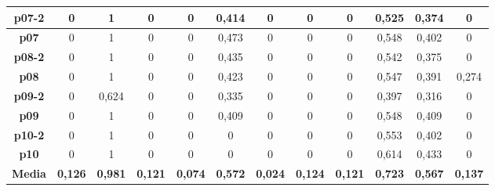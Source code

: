 \documentclass{article}
\begin{document}
\begin{landscape}
\begin{table}[]
\begin{tabular}{|c|c|c|c|c|c|c|c|c|c|c|c|}
    \textbf{p07-2}  &  0      &  1      &  0      &  0      &  0,414  &  0      &  0      &  0      &  0,525  &  0,374  &  0     \\ \hline
    \textbf{p07}    &  0      &  1      &  0      &  0      &  0,473  &  0      &  0      &  0      &  0,548  &  0,402  &  0     \\ \hline
    \textbf{p08-2}  &  0      &  1      &  0      &  0      &  0,435  &  0      &  0      &  0      &  0,542  &  0,375  &  0     \\ \hline
    \textbf{p08}    &  0      &  1      &  0      &  0      &  0,423  &  0      &  0      &  0      &  0,547  &  0,391  &  0,274 \\ \hline
    \textbf{p09-2}  &  0      &  0,624  &  0      &  0      &  0,335  &  0      &  0      &  0      &  0,397  &  0,316  &  0     \\ \hline
    \textbf{p09}    &  0      &  1      &  0      &  0      &  0,409  &  0      &  0      &  0      &  0,548  &  0,409  &  0     \\ \hline
    \textbf{p10-2}  &  0      &  1      &  0      &  0      &  0      &  0      &  0      &  0      &  0,553  &  0,402  &  0     \\ \hline
    \textbf{p10}    &  0      &  1      &  0      &  0      &  0      &  0      &  0      &  0      &  0,614  &  0,433  &  0     \\ \hline
    \textbf{Media}  &  \textbf{0,126}  &  \textbf{0,981}  &  \textbf{0,121}  &  \textbf{0,074}  &  \textbf{0,572}  &  \textbf{0,024}  &  \textbf{0,124}  &  \textbf{0,121}  &  \textbf{0,723}  &  \textbf{0,567}  &  \textbf{0,137} \\ \hline
    \end{tabular}
    \end{table}
    \end{landscape}
    
\end{document}
